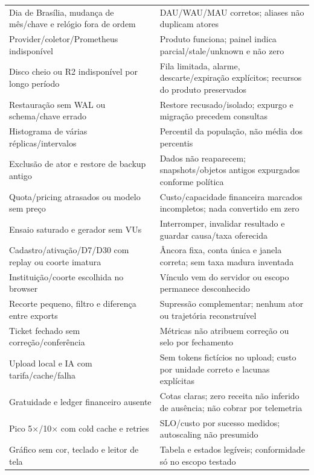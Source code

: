 \documentclass[10pt,a4paper]{article}
\renewcommand{\arraystretch}{1.2}
\begin{document}
{\begin{longtable}[]{@{}
  >{\raggedright\arraybackslash}p{}
  >{\raggedright\arraybackslash}p{}@{}}
Dia de Brasília, mudança de mês/chave e relógio fora de ordem &
DAU/WAU/MAU corretos; aliases não duplicam atores \\
Provider/coletor/Prometheus indisponível & Produto funciona; painel
indica parcial/stale/unknown e não zero \\
Disco cheio ou R2 indisponível por longo período & Fila limitada,
alarme, descarte/expiração explícitos; recursos do produto
preservados \\
Restauração sem WAL ou schema/chave errado & Restore recusado/isolado;
expurgo e migração precedem consultas \\
Histograma de várias réplicas/intervalos & Percentil da população, não
média dos percentis \\
Exclusão de ator e restore de backup antigo & Dados não reaparecem;
snapshots/objetos antigos expurgados conforme política \\
Quota/pricing atrasados ou modelo sem preço & Custo/capacidade
financeira marcados incompletos; nada convertido em zero \\
Ensaio saturado e gerador sem VUs & Interromper, invalidar resultado e
guardar causa/taxa oferecida \\
Cadastro/ativação/D7/D30 com replay ou coorte imatura & Âncora fixa,
conta única e janela correta; sem taxa madura inventada \\
Instituição/coorte escolhida no browser & Vínculo vem do servidor ou
escopo permanece desconhecido \\
Recorte pequeno, filtro e diferença entre exports & Supressão
complementar; nenhum ator ou trajetória reconstruível \\
Ticket fechado sem correção/conferência & Métricas não atribuem correção
ou selo por fechamento \\
Upload local e IA com tarifa/cache/falha & Sem tokens fictícios no
upload; custo por unidade correto e lacunas explícitas \\
Gratuidade e ledger financeiro ausente & Cotas claras; zero receita não
inferido de ausência; não cobrar por telemetria \\
Pico 5×/10× com cold cache e retries & SLO/custo por sucesso medidos;
autoscaling não presumido \\
Gráfico sem cor, teclado e leitor de tela & Tabela e estados legíveis;
conformidade só no escopo testado \\
\end{longtable}
\renewcommand{\arraystretch}{1.2}
\fontsize{9.5}{12.1}\selectfont
}
\end{document}
